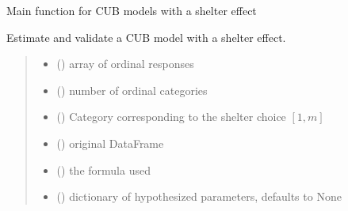 \documentclass[letterpaper,10pt,english]{sphinxmanual}
\begin{document}

\begin{fulllineitems}
\label{\detokenize{cubmods:cubmods.cubsh.mle}}
\pysigstartsignatures
{}
\pysigstopsignatures
\sphinxAtStartPar
Main function for CUB models with a shelter effect

\sphinxAtStartPar
Estimate and validate a CUB model with a shelter effect.
\begin{quote}\begin{description}
\begin{itemize}
\item {} 
\sphinxAtStartPar
{} () \textendash{} array of ordinal responses

\item {} 
\sphinxAtStartPar
{} () \textendash{} number of ordinal categories

\item {} 
\sphinxAtStartPar
{} () \textendash{} Category corresponding to the shelter choice \([1,m]\)

\item {} 
\sphinxAtStartPar
{} () \textendash{} original DataFrame

\item {} 
\sphinxAtStartPar
{} () \textendash{} the formula used

\item {} 
\sphinxAtStartPar
{} (\sphinxstyleliteralemphasis{\sphinxupquote{, }}) \textendash{} dictionary of hypothesized parameters, defaults to None


\end{itemize}
\end{description}
\end{quote}
\end{fulllineitems}
\end{document}
